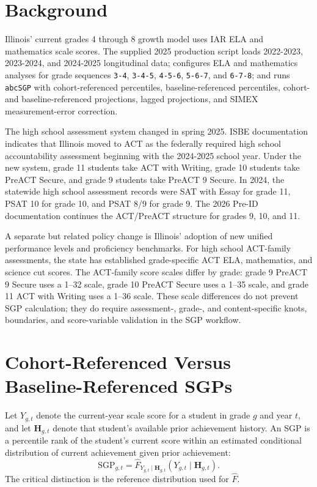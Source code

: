 \documentclass[11pt]{article}
\begin{document}
\section{Background}

Illinois' current grades 4 through 8 growth model uses IAR ELA and mathematics scale scores. The supplied 2025 production script loads 2022-2023, 2023-2024, and 2024-2025 longitudinal data; configures ELA and mathematics analyses for grade sequences \texttt{3-4}, \texttt{3-4-5}, \texttt{4-5-6}, \texttt{5-6-7}, and \texttt{6-7-8}; and runs \texttt{abcSGP} with cohort-referenced percentiles, baseline-referenced percentiles, cohort- and baseline-referenced projections, lagged projections, and SIMEX measurement-error correction.

The high school assessment system changed in spring 2025. ISBE documentation indicates that Illinois moved to ACT as the federally required high school accountability assessment beginning with the 2024-2025 school year. Under the new system, grade 11 students take ACT with Writing, grade 10 students take PreACT Secure, and grade 9 students take PreACT 9 Secure. In 2024, the statewide high school assessment records were SAT with Essay for grade 11, PSAT 10 for grade 10, and PSAT 8/9 for grade 9. The 2026 Pre-ID documentation continues the ACT/PreACT structure for grades 9, 10, and 11.

A separate but related policy change is Illinois' adoption of new unified performance levels and proficiency benchmarks. For high school ACT-family assessments, the state has established grade-specific ACT ELA, mathematics, and science cut scores. The ACT-family score scales differ by grade: grade 9 PreACT 9 Secure uses a 1--32 scale, grade 10 PreACT Secure uses a 1--35 scale, and grade 11 ACT with Writing uses a 1--36 scale. These scale differences do not prevent SGP calculation; they do require assessment-, grade-, and content-specific knots, boundaries, and score-variable validation in the SGP workflow.

\section{Cohort-Referenced Versus Baseline-Referenced SGPs}

Let \(Y_{g,t}\) denote the current-year scale score for a student in grade \(g\) and year \(t\), and let \(\mathbf{H}_{g,t}\) denote that student's available prior achievement history. An SGP is a percentile rank of the student's current score within an estimated conditional distribution of current achievement given prior achievement:
\[
  \mathrm{SGP}_{g,t} = \widehat{F}_{Y_{g,t}\mid \mathbf{H}_{g,t}}(Y_{g,t}\mid \mathbf{H}_{g,t}).
\]
The critical distinction is the reference distribution used for \(\widehat{F}\).
\end{document}
